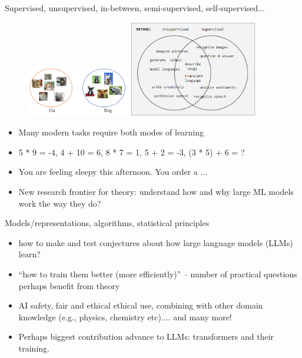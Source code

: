 \documentclass[final]{beamer}
\begin{document}
\begin{frame}{Supervised, unsupervised, in-between, semi-supervised, self-supervised...}
	\begin{figure}
		\centering
		\includegraphics[width=0.4\textwidth]{clustering.png}
		\includegraphics[width=0.5\textwidth]{supervisedVsUnsupervised.png}
	\end{figure}
	\begin{itemize}
		\item Many modern tasks require both modes of learning
		\pause
		\item 5 * 9 = -4, 4 + 10 = 6, 8 * 7 = 1, 5 + 2 = -3, (3 * 5) + 6 = ?
		\pause
		\item You are feeling sleepy this afternoon. You order a ...
		\pause
		\item New research frontier for theory: understand how and why large ML models work the way they do?
	\end{itemize}

\end{frame}
\begin{frame}{Models/representations, algorithms, statistical principles}
	\begin{itemize}
		\item how to make and test conjectures about how large language models (LLMs) learn?
		\pause
		\item ``how to train them better (more efficiently)'' -- number of practical questions perhaps benefit from theory
		\pause 
		\item AI safety, fair and ethical ethical use, combining with other domain knowledge (e.g., physics, chemistry etc).... and many more!
		\pause 
		\item Perhaps biggest contribution advance to LLMs: transformers and their training.
	\end{itemize}
\end{frame}
\end{document}
